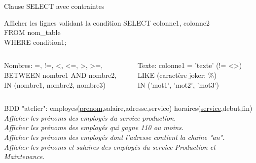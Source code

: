 \documentclass[xetex,dvipsnames]{beamer}
\begin{document}
\begin{frame}[t]{Clause SELECT avec contraintes}
\begin{alertblock}{Afficher les lignes validant la condition}
		SELECT colonne1, colonne2 \\FROM nom\_table \\WHERE condition1; %
	\end{alertblock}

\begin{footnotesize}
 \begin{columns}[t]
    \begin{column}{0.45\textwidth}
	\begin{block}{Nombres:}
		=, !=, <, <=, >, >=,
		\\BETWEEN nombre1 AND nombre2,
		\\IN (nombre1, nombre2, nombre3)
	\end{block}
	    \end{column}
	    \begin{column}{0.55\textwidth}
		\begin{block}{Texte:}
colonne1 = 'texte' (!= <>) 
\\LIKE (caractère joker: \%)
\\IN ('mot1', 'mot2', 'mot3')
	\end{block}
		    \end{column}
	    \end{columns}
\end{footnotesize}

\begin{scriptsize}
\vspace{1em}
BDD "atelier": employes(\underline{prenom},salaire,adresse,service) horaires(\underline{service},debut,fin)\\
\vspace{0.5em}
		\textit{Afficher les prénoms des employés du service production.}\\
		\textit{Afficher les prénoms des employés qui gagne 110 ou moins.}\\
		\textit{Afficher les prénoms des employés dont l'adresse contient la chaine "an".}\\
		\textit{Afficher les prénoms et salaires des employés du service Production et Maintenance.}\\
\end{scriptsize}
\end{frame}
\end{document}
